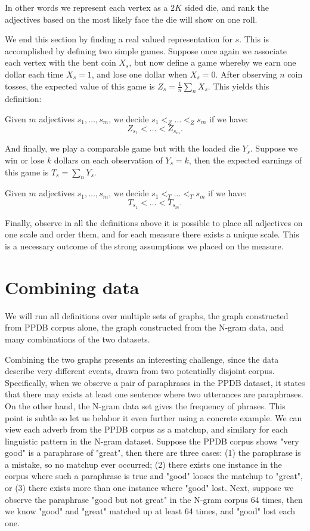 In other words we represent each vertex as a $2K$ sided die, and rank the adjectives based on the most likely face the die will show on one roll.

We end this section by finding a real valued representation for $s$. This is accomplished by defining two simple games. Suppose once again we associate each vertex with the bent coin $X_s$, but now define a game whereby we earn one dollar each time $X_s = 1$, and lose one dollar when $X_s = 0$. After observing $n$ coin tosses, the expected value of this game is $Z_s = \frac{1}{n} \sum_n X_{s}$. This yields this definition:

\theoremstyle{definition}
\begin{definition}
Given $m$ adjectives $s_1, \ldots, s_m$, we decide $s_1 <_{Z} \ldots <_Z s_m$ if we have:
	\[
		Z_{s_1} < \ldots < Z_{s_m}.
	\]
\end{definition}

And finally, we play a comparable game but with the loaded die $Y_s$. Suppose we win or lose $k$ dollars on each observation of $Y_s = k$, then the expected earnings of this game is $T_s = \sum_{n} Y_s$.

\begin{definition}
Given $m$ adjectives $s_1, \ldots, s_m$, we decide $s_1 <_{T} \ldots <_T s_m$ if we have:
	\[
		T_{s_1} < \ldots < T_{s_m}.
	\]
\end{definition}

Finally, observe in all the definitions above it is possible to place all adjectives on one scale and order them, and for each measure there exists a unique scale. This is a necessary outcome of the strong assumptions we placed on the measure. 

\section{Combining data}

We will run all definitions over multiple sets of graphs, the graph constructed from PPDB corpus alone, the graph constructed from the N-gram data, and many combinations of the two datasets. 

Combining the two graphs presents an interesting challenge, since the data describe very different events, drawn from two potentially disjoint corpus. Specifically, when we observe a pair of paraphrases in the PPDB dataset, it states that there may exists at least one sentence where two utterances are paraphrases. On the other hand, the N-gram data set gives the frequency of phrases. This point is subtle so let us belabor it even further using a concrete example. We can view each adverb from the PPDB corpus as a matchup, and similary for each linguistic pattern in the N-gram dataset. Suppose the PPDB corpus shows "very good" is a paraphrase of "great", then there are three cases: (1) the paraphrase is a mistake, so no matchup ever occurred; (2) there exists one instance in the corpus where such a paraphrase is true and "good" looses the matchup to "great", or (3) there exists more than one instance where "good" lost. Next, suppose we observe the paraphrase "good but not great" in the N-gram corpus 64 times, then we know "good" and "great" matched up at least 64 times, and "good" lost each one. 

